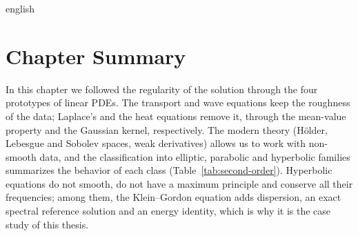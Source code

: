 \documentclass[0000.tex]{subfiles}
\begin{document}
\begin{hyphenrules}{english}
\section{Chapter Summary}\label{sec:ch2-summary}

In this chapter we followed the regularity of the solution through the four prototypes of linear PDEs.
The transport and wave equations keep the roughness of the data; Laplace's and the heat equations remove
it, through the mean-value property and the Gaussian kernel, respectively. The modern theory (Hölder,
Lebesgue and Sobolev spaces, weak derivatives) allows us to work with non-smooth data, and the
classification into elliptic, parabolic and hyperbolic families summarizes the behavior of each class
(Table~\ref{tab:second-order}). Hyperbolic equations do not smooth, do not have a maximum principle and
conserve all their frequencies; among them, the Klein--Gordon equation adds dispersion, an exact
spectral reference solution and an energy identity, which is why it is the case study of this thesis.

\end{hyphenrules}

\ifSubfilesClassLoaded{}{}
\end{document}
